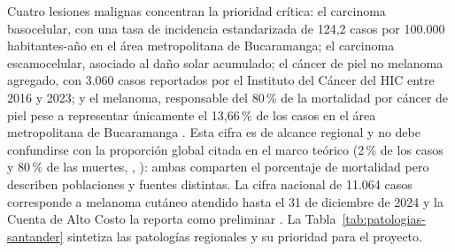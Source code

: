 Cuatro lesiones malignas concentran la prioridad crítica: el carcinoma basocelular, con una tasa de incidencia estandarizada de 124,2 casos por 100.000 habitantes-año en el área metropolitana de Bucaramanga; el carcinoma escamocelular, asociado al daño solar acumulado; el cáncer de piel no melanoma agregado, con 3.060 casos reportados por el Instituto del Cáncer del HIC entre 2016 y 2023; y el melanoma, responsable del 80\,\% de la mortalidad por cáncer de piel pese a representar únicamente el 13,66\,\% de los casos en el área metropolitana de Bucaramanga \parencite{uribe2018bccbucaramanga}. Esta cifra es de alcance regional y no debe confundirse con la proporción global citada en el marco teórico (2\,\% de los casos y 80\,\% de las muertes, \citeauthor{urban2021globalburden}, \citeyear{urban2021globalburden}): ambas comparten el porcentaje de mortalidad pero describen poblaciones y fuentes distintas. La cifra nacional de 11.064 casos corresponde a melanoma cutáneo atendido hasta el 31 de diciembre de 2024 y la Cuenta de Alto Costo la reporta como preliminar \parencite{cuentaaltocosto2025melanoma}. La Tabla~\ref{tab:patologias-santander} sintetiza las patologías regionales y su prioridad para el proyecto.

